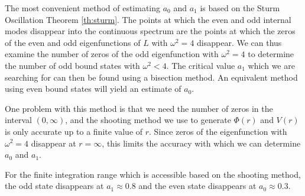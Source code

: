 


The most convenient method of estimating $a_0$ and $a_1$ is based on the Sturm Oscillation Theorem \ref{th:sturm}. The points at which the even and odd internal modes disappear into the continuous spectrum are the points at which the zeros of the even and odd eigenfunctions of $L$ with $\omega^2=4$ disappear. We can thus examine the number of zeros of the odd eigenfunction with $\omega^2=4$ to determine the number of odd bound states with $\omega^2<4$. The critical value $a_1$ which we are searching for can then be found using a bisection method. An equivalent method using even bound states will yield an estimate of $a_0$.

One problem with this method is that we need the number of zeros in the interval $(0,\infty)$, and the shooting method we use to generate $\Phi(r)$ and $V(r)$ is only accurate up to a finite value of $r$. Since zeros of the eigenfunction with $\omega^2=4$ disappear at $r=\infty$, this limits the accuracy with which we can determine $a_0$ and $a_1$.

For the finite integration range which is accessible based on the shooting method, the odd state disappears at $a_1 \approx 0.8$ and the even state disappears at $a_0 \approx 0.3$.

